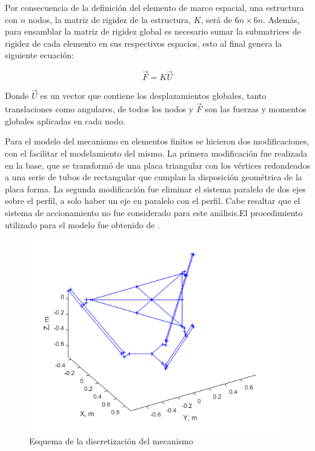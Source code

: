 Por consecuencia de la definición del elemento de marco espacial, una estructura con $n$ nodos, la matriz de rigidez de la estructura, $K$, será de $6n\times6n$. Además, para ensamblar la matriz de rigidez global es necesario sumar la submatrices de rigidez de cada elemento en sus respectivos espacios, esto al final genera la siguiente ecuación:

\begin{equation}
    \vec{F} = K \vec{U}
\end{equation}

Donde $\vec{U}$ es un vector que contiene los desplazamientos globales, tanto translaciones como angulares, de todos los nodos y $\vec{F}$ son las fuerzas y momentos globales aplicadas en cada nodo.

Para el modelo del mecanismo en elementos finitos se hicieron dos modificaciones, con el facilitar el modelamiento del mismo. La primera modificación fue realizada en la base, que se transformó de una placa triangular con los vértices redondeados a una serie de tubos de rectangular que cumplan la disposición geométrica de la placa forma. La segunda modificación fue eliminar el sistema paralelo de dos ejes sobre el perfil, a solo haber un eje en paralelo con el perfil. Cabe resaltar que el sistema de accionamiento no fue considerado para este análisis.El procedimiento utilizado para el modelo fue obtenido de \cite{kattan2010matlab}.

\begin{figure}[hbt!]
    \centering
    \includegraphics[width=\textwidth]{Cap4_DisenoBasico/Figura/AnalisisRigidez/MecanismoDiscretizado.png}
    \caption{Esquema de la discretización del mecanismo}
    \label{fig:MecanismoDiscretizado}
\end{figure}

